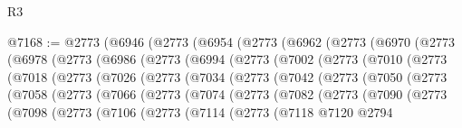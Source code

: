 \begin{lexlean}{R3}
\begin{coremodule}
@7168 := @2773
    (@6946
      (@2773
        (@6954
          (@2773
            (@6962
              (@2773
                (@6970
                  (@2773
                    (@6978
                      (@2773
                        (@6986
                          (@2773
                            (@6994
                              (@2773
                                (@7002
                                  (@2773
                                    (@7010
                                      (@2773
                                        (@7018
                                          (@2773
                                            (@7026
                                              (@2773
                                                (@7034
                                                  (@2773
                                                    (@7042
                                                      (@2773
                                                        (@7050
                                                          (@2773
                                                            (@7058
                                                              (@2773
                                                                (@7066
                                                                  (@2773
                                                                    (@7074
                                                                      (@2773
                                                                        (@7082
                                                                          (@2773
                                                                            (@7090
                                                                              (@2773
                                                                                (@7098
                                                                                  (@2773
                                                                                    (@7106
                                                                                      (@2773
                                                                                        (@7114
                                                                                          (@2773
                                                                                            (@7118
                                                                                              @7120
                                                                                              @2794

\end{coremodule}
\end{lexlean}
